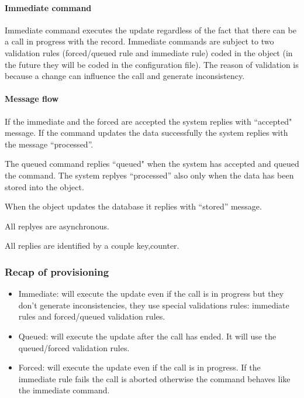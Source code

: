 \documentclass[a4paper]{article}
\begin{document}
\paragraph{Immediate command}
Immediate command executes the update regardless of the fact that there can be
a call in progress with the record.
Immediate commands are subject to two validation rules (forced/queued
rule and immediate rule) coded in the object (in the future they will be coded
in the configuration file). The reason of validation is because a change can influence
 the call and generate inconsistency.


\paragraph{Message flow}


If the immediate and the forced are accepted the system replies with
``accepted" message. If the command updates the data successfully the system
replies with the message ``processed''.

The queued command replies ``queued" when the system has accepted
and queued the command. The system replyes ``processed'' also only when the
data has been stored into the object.

When the object updates the database it replies with
``stored'' message.

All replyes are asynchronous.

All replies are identified by a couple \ll key,counter\gg. 

\subsubsection{Recap of provisioning}


\begin{itemize}
   \item Immediate: will execute the update even if the call is in progress but
   they don't generate inconsistencies, they use special validations rules:
   immediate rules and forced/queued validation rules.
   \item Queued: will execute the update after the call has ended. It will use
   the queued/forced validation rules.
   \item Forced: will execute the update even if the call is in progress. If 
  the immediate rule fails the call is aborted otherwise the command behaves 
 like the immediate command.
\end{itemize}
\end{document}
